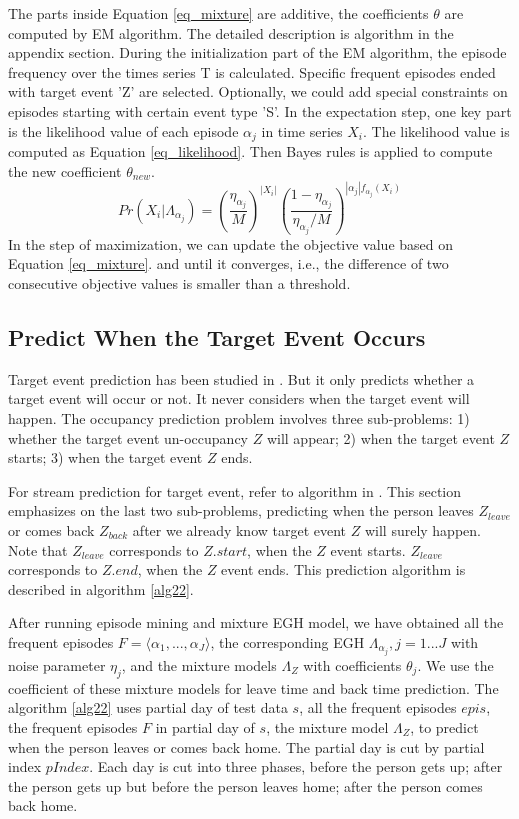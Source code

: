 The parts inside Equation \ref{eq_mixture} are additive, 
the coefficients $\theta$ are computed by EM algorithm. 
The detailed description is algorithm %
in the 
appendix section.
%
During the initialization %
part of the EM algorithm, 
the episode frequency over the times series T is calculated. 
Specific frequent episodes ended with target event 'Z' are selected. 
Optionally, 
we could add special constraints on episodes starting with 
certain event type 'S'. 
In the expectation step, 
one key part is the likelihood value of each episode $\alpha_j$ in time series $X_i$.
The likelihood value is computed as Equation \ref{eq_likelihood}.
Then Bayes rules is applied to compute the new coefficient $\theta_{new}$. 
\begin{equation}
\label{eq_likelihood}
Pr(X_i| \Lambda_{\alpha_j}) = (\frac{\eta_{\alpha_j}}{M})^{|X_i|} (\frac{1-\eta_{\alpha_j}}{\eta_{\alpha_j}/M})^{|\alpha_j|f_{\alpha_j}(X_i)}
\end{equation}
In the step of maximization, 
we can update the objective value based on Equation \ref{eq_mixture}. 
and until it converges, i.e., 
the difference of two consecutive objective values 
is smaller than a threshold.%

\subsection{Predict When the Target Event Occurs}
Target event prediction has been studied in  \cite{laxman2008stream}. 
But it only predicts whether a target event will occur or not. 
It never considers when the target event will happen. 
The occupancy prediction problem involves three sub-problems: 
1) whether the target event un-occupancy $Z$ will appear; 
2) when the target event $Z$ starts; 
3) when the target event $Z$ ends. 

For stream prediction for target event, 
refer to algorithm in \cite{laxman2008stream}. 
This section emphasizes on the last two sub-problems, 
predicting when the person leaves  $Z_{leave}$ or comes back $Z_{back}$ 
after we already know target event $Z$ will surely happen. 
Note that $Z_{leave}$ corresponds to $Z.start$, when the $Z$ event starts. 
$Z_{leave}$ corresponds to $Z.end$, when the $Z$ event ends. 
This prediction algorithm is described in algorithm \ref{alg22}. 

After running episode mining and mixture EGH model, 
we have obtained all the frequent episodes $F=\langle \alpha_1,..., \alpha_J \rangle$, 
the corresponding EGH $\Lambda_{\alpha_j}, j=1...J$ with noise parameter $\eta_j$, 
and the mixture models $\Lambda_Z$ with coefficients $\theta_j$.
We use the coefficient of these mixture models for leave time and back time prediction. 
The algorithm \ref{alg22} 
uses partial day of test data $s$, 
all the frequent episodes  $epis$, 
the frequent episodes $F$ in partial day of $s$, 
the mixture model $\Lambda_Z$, 
to predict when the person leaves or comes back home. 
The partial day is cut by partial index $pIndex$. 
Each day is cut into three phases, before the person gets up; 
after the person gets up but before the person leaves home;
after the person comes back home. 

